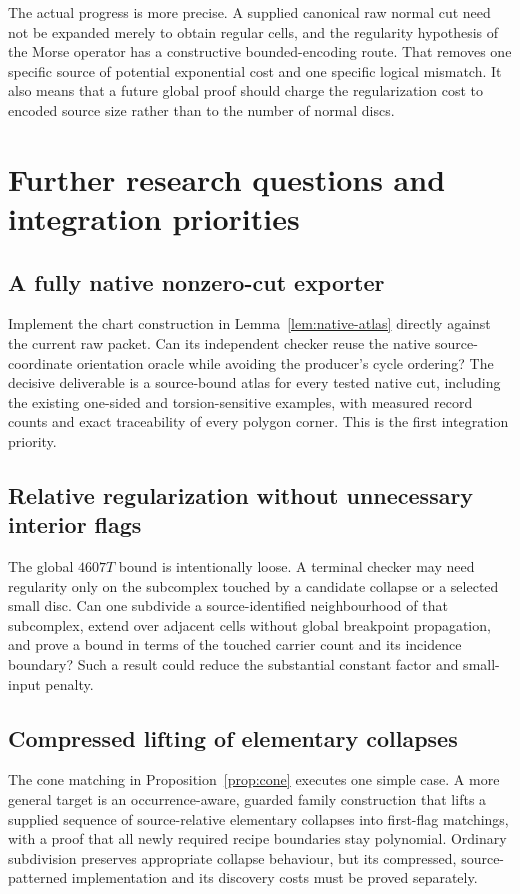 \documentclass[11pt]{article}
\theoremstyle{definition}\newtheorem{definition}[theorem]{Definition}
\theoremstyle{remark}\newtheorem{remark}[theorem]{Remark}
\begin{document}
The actual progress is more precise. A supplied canonical raw normal cut need not be expanded merely to obtain regular cells, and the regularity hypothesis of the Morse operator has a constructive bounded-encoding route. That removes one specific source of potential exponential cost and one specific logical mismatch. It also means that a future global proof should charge the regularization cost to encoded source size rather than to the number of normal discs.

\section{Further research questions and integration priorities}
\label{sec:future}

\subsection{A fully native nonzero-cut exporter}
Implement the chart construction in Lemma~\ref{lem:native-atlas} directly against the current raw packet. Can its independent checker reuse the native source-coordinate orientation oracle while avoiding the producer's cycle ordering? The decisive deliverable is a source-bound atlas for every tested native cut, including the existing one-sided and torsion-sensitive examples, with measured record counts and exact traceability of every polygon corner. This is the first integration priority.

\subsection{Relative regularization without unnecessary interior flags}
The global \(4607T\) bound is intentionally loose. A terminal checker may need regularity only on the subcomplex touched by a candidate collapse or a selected small disc. Can one subdivide a source-identified neighbourhood of that subcomplex, extend over adjacent cells without global breakpoint propagation, and prove a bound in terms of the touched carrier count and its incidence boundary? Such a result could reduce the substantial constant factor and small-input penalty.

\subsection{Compressed lifting of elementary collapses}
The cone matching in Proposition~\ref{prop:cone} executes one simple case. A more general target is an occurrence-aware, guarded family construction that lifts a supplied sequence of source-relative elementary collapses into first-flag matchings, with a proof that all newly required recipe boundaries stay polynomial. Ordinary subdivision preserves appropriate collapse behaviour, but its compressed, source-patterned implementation and its discovery costs must be proved separately.
\end{document}
